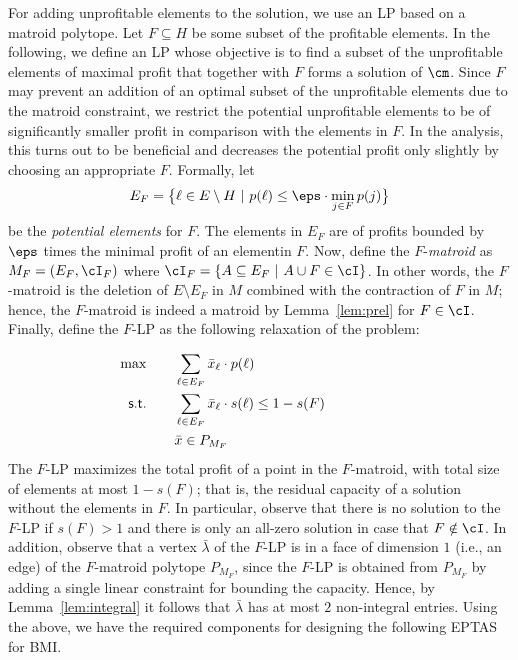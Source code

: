 For adding unprofitable elements to the solution, we use an LP based on a matroid polytope.  Let $F \subseteq H$ be some subset of the profitable elements. In the following, we define an LP whose objective is to find a subset of the unprofitable elements of maximal profit that together with $F$ forms a solution of $\cm$. Since $F$ may prevent an addition of an optimal subset of the unprofitable elements due to the matroid constraint, we restrict the potential unprofitable elements to be of significantly smaller profit in comparison with the elements in $F$. In the analysis, this turns out to be beneficial and decreases the potential profit only slightly by choosing an appropriate $F$. Formally, let \begin{equation}
	\label{E_F}
	E_F = \big\{\ell \in E \setminus H~|~ p(\ell) \leq \eps \cdot \min_{j \in F} p(j)\big\}
\end{equation} be the {\em potential elements} for $F$. The elements in $E_F$ are of profits bounded by $\eps$ times the minimal profit of an elementin $F$. Now, define the $F$-{\em matroid} as $M_F = (E_F,\cI_F)$ where  $\cI_F = \{A \subseteq E_F~|~ A \cup F \in \cI\}$. In other words, the $F$-matroid is the deletion of $E\setminus E_F$ in $M$ combined with the contraction of $F$ in $M$; hence, the $F$-matroid is indeed a matroid by Lemma~\ref{lem:prel} for $F \in \cI$. Finally, define the $F$-LP as the following relaxation of the problem:

 \begin{equation}
 	\label{LP}
 	\begin{aligned}
 		~~~~~ \max\quad        & ~~~\sum_{\ell \in E_F} \bar{x}_{\ell}   \cdot p(\ell)             ~~~~~~~~~~~~~~~~~~~~~                                                \\
 		\textsf{s.t.\quad} & ~~~\sum_{\ell \in E_F} \bar{x}_{\ell}  \cdot s(\ell)         \leq  1-s(F) ~~~~~~~~~~~~~~~~~~~~~           \\  
 		& ~~~\bar{x} \in P_{M_F} \\
 	\end{aligned}
 \end{equation}  The $F$-LP maximizes the total profit of a point in the $F$-matroid, with total size of elements at most $1-s(F)$; that is, the residual capacity of a solution without the elements in $F$. In particular, observe that there is no solution to the $F$-LP if $s(F) > 1$ and there is only an all-zero solution in case that $F \notin \cI$.  In addition, observe that a vertex $\bar{\lambda}$ of the $F$-LP is in  a face of dimension $1$ (i.e., an edge) of the $F$-matroid polytope $P_{M_F}$, since the $F$-LP is obtained from $P_{M_F}$ by adding a single linear constraint for bounding the capacity. Hence, by Lemma~\ref{lem:integral} it follows that $\bar{\lambda}$ has at most $2$ non-integral entries. Using the above, we have the required components for designing the following EPTAS for BMI. 




